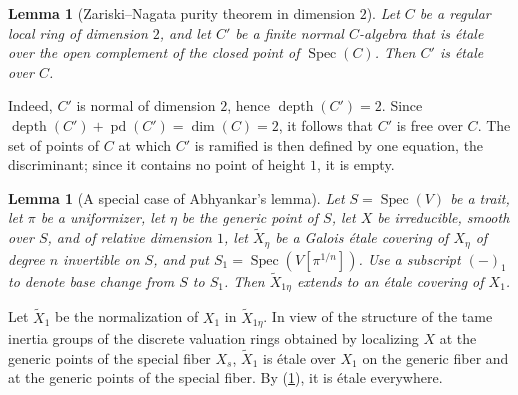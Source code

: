\documentclass[12pt,oneside,english]{smfbook}
\DeclareMathOperator{\spec}{Spec}
\newtheorem{lemma}[subsubsection]{Lemma}
\begin{document}
\begin{lemma}[Zariski--Nagata purity theorem in dimension $2$] \label{I:5-2-4} %
Let $C$ be a regular local ring of dimension $2$, and let $C'$ be a finite normal $C$-algebra that is étale over the open complement of the closed point of $\spec(C)$. Then $C'$ is étale over $C$.
\end{lemma}

Indeed, $C'$ is normal of dimension $2$, hence $\operatorname{depth}(C')=2$. Since $\operatorname{depth}(C')+\operatorname{pd}(C')=\dim(C)=2$, it follows that $C'$ is free over $C$. The set of points of $C$ at which $C'$ is ramified is then defined by one equation, the discriminant; since it contains no point of height $1$, it is empty.

\begin{lemma}[A special case of Abhyankar's lemma]\label{I:5-2-5} %
Let $S=\spec(V)$ be a trait, let $\pi$ be a uniformizer, let $\eta$ be the generic point of $S$, let $X$ be irreducible, smooth over $S$, and of relative dimension $1$, let $\widetilde X_\eta$ be a Galois étale covering of $X_\eta$ of degree $n$ invertible on $S$, and put $S_1=\spec\left(V[\pi^{1/n}]\right)$. Use a subscript $(-)_1$ to denote base change from $S$ to $S_1$. Then $\widetilde X_{1\eta}$ extends to an étale covering of $X_1$.
\end{lemma}

Let $\widetilde X_1$ be the normalization of $X_1$ in $\widetilde X_{1\eta}$. In view of the structure of the tame inertia groups of the discrete valuation rings obtained by localizing $X$ at the generic points of the special fiber $X_s$, $\widetilde X_1$ is étale over $X_1$ on the generic fiber and at the generic points of the special fiber. By (\ref{I:5-2-4}), it is étale everywhere.

\subsubsection{}\label{I:5-2-6} %
\end{document}

